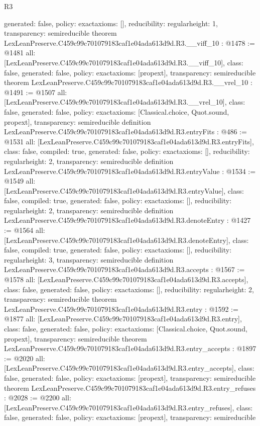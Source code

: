 \begin{lexlean}{R3}
\begin{coremodule}
{  generated: false,
  policy: exact{axioms: []},
  reducibility: regular{height: 1},
  transparency: semireducible
}
theorem LexLeanPreserve.C459c99c701079183caf1e04ada613d9d.R3.__viff_10 : @1478 := @1481 {
  all: [LexLeanPreserve.C459c99c701079183caf1e04ada613d9d.R3.__viff_10],
  class: false,
  generated: false,
  policy: exact{axioms: [propext]},
  transparency: semireducible
}
theorem LexLeanPreserve.C459c99c701079183caf1e04ada613d9d.R3.__vrel_10 : @1491 := @1507 {
  all: [LexLeanPreserve.C459c99c701079183caf1e04ada613d9d.R3.__vrel_10],
  class: false,
  generated: false,
  policy: exact{axioms: [Classical.choice, Quot.sound, propext]},
  transparency: semireducible
}
definition LexLeanPreserve.C459c99c701079183caf1e04ada613d9d.R3.entryFits : @486 := @1531 {
  all: [LexLeanPreserve.C459c99c701079183caf1e04ada613d9d.R3.entryFits],
  class: false,
  compiled: true,
  generated: false,
  policy: exact{axioms: []},
  reducibility: regular{height: 2},
  transparency: semireducible
}
definition LexLeanPreserve.C459c99c701079183caf1e04ada613d9d.R3.entryValue : @1534 := @1549 {
  all: [LexLeanPreserve.C459c99c701079183caf1e04ada613d9d.R3.entryValue],
  class: false,
  compiled: true,
  generated: false,
  policy: exact{axioms: []},
  reducibility: regular{height: 2},
  transparency: semireducible
}
definition LexLeanPreserve.C459c99c701079183caf1e04ada613d9d.R3.denoteEntry : @1427 := @1564 {
  all: [LexLeanPreserve.C459c99c701079183caf1e04ada613d9d.R3.denoteEntry],
  class: false,
  compiled: true,
  generated: false,
  policy: exact{axioms: []},
  reducibility: regular{height: 3},
  transparency: semireducible
}
definition LexLeanPreserve.C459c99c701079183caf1e04ada613d9d.R3.accepts : @1567 := @1578 {
  all: [LexLeanPreserve.C459c99c701079183caf1e04ada613d9d.R3.accepts],
  class: false,
  generated: false,
  policy: exact{axioms: []},
  reducibility: regular{height: 2},
  transparency: semireducible
}
theorem LexLeanPreserve.C459c99c701079183caf1e04ada613d9d.R3.entry : @1592 := @1877 {
  all: [LexLeanPreserve.C459c99c701079183caf1e04ada613d9d.R3.entry],
  class: false,
  generated: false,
  policy: exact{axioms: [Classical.choice, Quot.sound, propext]},
  transparency: semireducible
}
theorem LexLeanPreserve.C459c99c701079183caf1e04ada613d9d.R3.entry_accepts : @1897 := @2020 {
  all: [LexLeanPreserve.C459c99c701079183caf1e04ada613d9d.R3.entry_accepts],
  class: false,
  generated: false,
  policy: exact{axioms: [propext]},
  transparency: semireducible
}
theorem LexLeanPreserve.C459c99c701079183caf1e04ada613d9d.R3.entry_refuses : @2028 := @2200 {
  all: [LexLeanPreserve.C459c99c701079183caf1e04ada613d9d.R3.entry_refuses],
  class: false,
  generated: false,
  policy: exact{axioms: [propext]},
  transparency: semireducible
}


\end{coremodule}
\end{lexlean}
